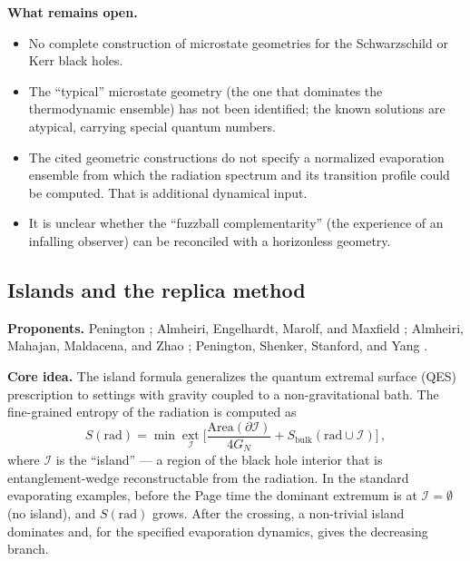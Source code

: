 \documentclass[11pt,letterpaper]{article}
\theoremstyle{plain}
\theoremstyle{definition}
\theoremstyle{remark}
\begin{document}
\medskip
\noindent
\textbf{What remains open.}
\begin{itemize}
  \item No complete construction of microstate geometries for the
    Schwarzschild or Kerr black holes.
  \item The ``typical'' microstate geometry (the one that dominates the
    thermodynamic ensemble) has not been identified; the known solutions are
    atypical, carrying special quantum numbers.
  \item The cited geometric constructions do not specify a normalized
    evaporation ensemble from which the radiation spectrum and its transition
    profile could be computed. That is additional dynamical input.
  \item It is unclear whether the ``fuzzball complementarity'' (the experience of an
    infalling observer) can be reconciled with a horizonless geometry.
\end{itemize}

\subsection{Islands and the replica method}
\label{app:islands}

\textbf{Proponents.}  Penington \cite{penington2020}; Almheiri, Engelhardt,
Marolf, and Maxfield \cite{almheirietal2019}; Almheiri, Mahajan, Maldacena,
and Zhao \cite{almheirietal2020islands}; Penington, Shenker, Stanford, and
Yang \cite{pssyetal2022}.

\medskip
\noindent
\textbf{Core idea.}  The island formula generalizes the quantum extremal
surface (QES) prescription \cite{engelhardtwall2015} to settings with gravity
coupled to a non-gravitational bath.  The fine-grained entropy of the radiation
is computed as
\begin{equation}
  S(\text{rad}) = \min \operatorname*{ext}_{\mathcal{I}}
  \biggl[\frac{\mathrm{Area}(\partial\mathcal{I})}{4G_N}
  + S_{\mathrm{bulk}}(\text{rad} \cup \mathcal{I})\biggr]\,,
  \label{eq16:island_formula}
\end{equation}
where $\mathcal{I}$ is the ``island'' --- a region of the black hole interior
that is entanglement-wedge reconstructable from the radiation.  In the standard evaporating examples, before the
Page time the dominant extremum is at $\mathcal{I} = \emptyset$ (no island), and
$S(\text{rad})$ grows.  After the crossing, a non-trivial island dominates and, for the
specified evaporation dynamics, gives the decreasing branch.
\end{document}
